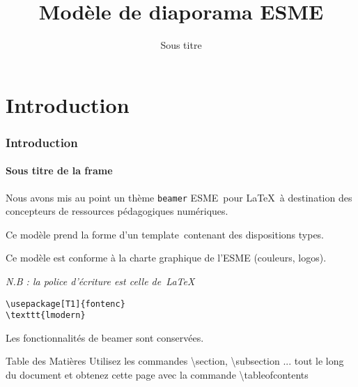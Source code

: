 \documentclass[aspectratio=169]{beamer}
\title{Modèle de diaporama ESME}
\subtitle{Sous titre}
\date[]{}
\author[]{}
\begin{document}
\begin{frame}
\titlepage
\end{frame}

\section{Introduction}

\begin{frame}[fragile] 
\frametitle{Introduction} 
\framesubtitle{Sous titre de la frame} 

Nous avons mis au point un thème \texttt{beamer} \og ESME\fg~pour 
\LaTeX~à destination des concepteurs de ressources pédagogiques 
numériques.\newline

Ce modèle prend la forme d'un \og template\fg~contenant des 
dispositions types.\newline

Ce modèle est conforme à la charte graphique de l'ESME (couleurs, 
logos).

\emph{N.B : la police d'écriture est celle de~\LaTeX}\newline

\begin{verbatim}
\usepackage[T1]{fontenc}
\texttt{lmodern}
\end{verbatim}

Les fonctionnalités de beamer sont conservées.
\end{frame}

\begin{frame}{Table des Matières}
    \tableofcontents
    \scriptsize
    Utilisez les commandes \textbackslash section, \textbackslash subsection ...
    tout le long du document et obtenez cette page avec la commande 
    \textbackslash tableofcontents
\end{frame}
\end{document}
